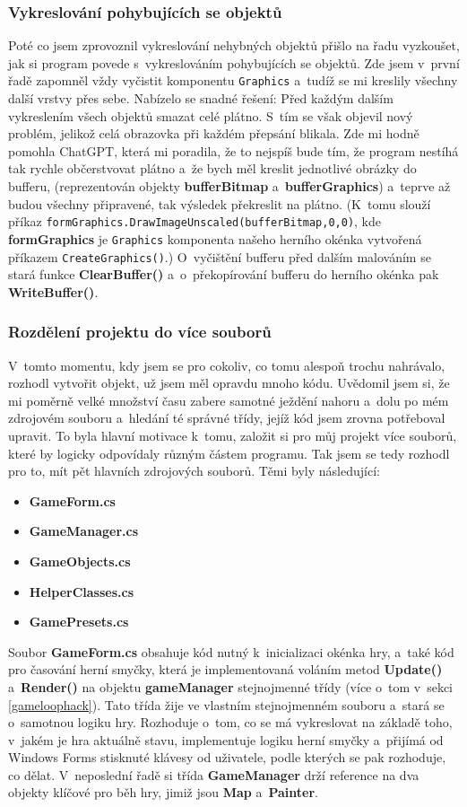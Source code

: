 \documentclass[a4]{article}
\begin{document}
\subsubsection{Vykreslování pohybujících se objektů} \label{buffering}
Poté co jsem zprovoznil vykreslování nehybných objektů přišlo na řadu vyzkoušet, jak si program povede s~vykreslováním pohybujících se objektů. Zde jsem v~první řadě zapomněl vždy vyčistit komponentu \verb|Graphics| a~tudíž se mi kreslily všechny další vrstvy přes sebe. Nabízelo se snadné řešení: Před každým dalším vykreslením všech objektů smazat celé plátno. S~tím se však objevil nový problém, jelikož celá obrazovka při každém přepsání blikala. Zde mi hodně pomohla ChatGPT, která mi poradila, že to nejspíš bude tím, že program nestíhá tak rychle občerstvovat plátno a~že bych měl kreslit jednotlivé obrázky do bufferu, (reprezentován objekty \textbf{bufferBitmap} a~\textbf{bufferGraphics}) a~teprve až budou všechny připravené, tak výsledek překreslit na plátno. (K~tomu slouží příkaz \verb|formGraphics.DrawImageUnscaled(bufferBitmap,0,0)|, kde \textbf{formGraphics} je \verb|Graphics| komponenta našeho herního okénka vytvořená příkazem \verb|CreateGraphics()|.) O~vyčištění bufferu před dalším malováním se stará funkce \textbf{ClearBuffer()} a~o~překopírování bufferu do herního okénka pak \textbf{WriteBuffer()}.

\subsubsection{Rozdělení projektu do více souborů}
V~tomto momentu, kdy jsem se pro cokoliv, co tomu alespoň trochu nahrávalo, rozhodl vytvořit objekt, už jsem měl opravdu mnoho kódu. Uvědomil jsem si, že mi poměrně velké množství času zabere samotné ježdění nahoru a~dolu po mém zdrojovém souboru a~hledání té správné třídy, jejíž kód jsem zrovna potřeboval upravit. To byla hlavní motivace k~tomu, založit si pro můj projekt více souborů, které by logicky odpovídaly různým částem programu. Tak jsem se tedy rozhodl pro to, mít pět hlavních zdrojových souborů. Těmi byly následující:
\begin{itemize}
    \item \textbf{GameForm.cs}
    \item \textbf{GameManager.cs}
    \item \textbf{GameObjects.cs}
    \item \textbf{HelperClasses.cs}
    \item \textbf{GamePresets.cs}
\end{itemize}
Soubor \textbf{GameForm.cs} obsahuje kód nutný k~inicializaci okénka hry, a~také kód pro časování herní smyčky, která je implementovaná voláním metod \textbf{Update()} a~\textbf{Render()} na objektu \textbf{gameManager} stejnojmenné třídy (více o~tom v~sekci \ref{gameloophack}). Tato třída žije ve vlastním stejnojmenném souboru a~stará se o~samotnou logiku hry. Rozhoduje o~tom, co se má vykreslovat na základě toho, v~jakém je hra aktuálně stavu, implementuje logiku herní smyčky a~přijímá od Windows Forms stisknuté klávesy od uživatele, podle kterých se pak rozhoduje, co dělat. V~neposlední řadě si třída \textbf{GameManager} drží reference na dva objekty klíčové pro běh hry, jimiž jsou \textbf{Map} a~\textbf{Painter}.
\end{document}
